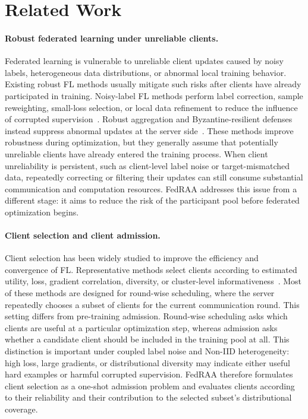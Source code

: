 \documentclass[conference]{IEEEtran}
\theoremstyle{definition}
\theoremstyle{remark}
\begin{document}
\section{Related Work}

\paragraph{Robust federated learning under unreliable clients.}
Federated learning is vulnerable to unreliable client updates caused by noisy labels, heterogeneous data distributions, or abnormal local training behavior.
Existing robust FL methods usually mitigate such risks after clients have already participated in training.
Noisy-label FL methods perform label correction, sample reweighting, small-loss selection, or local data refinement to reduce the influence of corrupted supervision~\cite{natarajan2013learning,tsouvalas2022labeling,xu2022fedcorr,liang2023fednoisy,hao2025fedcs,sivasubramanian2024gcfl}.
Robust aggregation and Byzantine-resilient defenses instead suppress abnormal updates at the server side~\cite{pillutla2022robust,yin2018byzantine,cao2021fltrust}.
These methods improve robustness during optimization, but they generally assume that potentially unreliable clients have already entered the training process.
When client unreliability is persistent, such as client-level label noise or target-mismatched data, repeatedly correcting or filtering their updates can still consume substantial communication and computation resources.
FedRAA addresses this issue from a different stage: it aims to reduce the risk of the participant pool before federated optimization begins.

\paragraph{Client selection and client admission.}
Client selection has been widely studied to improve the efficiency and convergence of FL.
Representative methods select clients according to estimated utility, loss, gradient correlation, diversity, or cluster-level informativeness~\cite{lai2021oort,cho2022power,tang2022fedcor,zhang2023dpp,ACFL}.
Most of these methods are designed for round-wise scheduling, where the server repeatedly chooses a subset of clients for the current communication round.
This setting differs from pre-training admission.
Round-wise scheduling asks which clients are useful at a particular optimization step, whereas admission asks whether a candidate client should be included in the training pool at all.
This distinction is important under coupled label noise and Non-IID heterogeneity: high loss, large gradients, or distributional diversity may indicate either useful hard examples or harmful corrupted supervision.
FedRAA therefore formulates client selection as a one-shot admission problem and evaluates clients according to their reliability and their contribution to the selected subset's distributional coverage.
\end{document}
